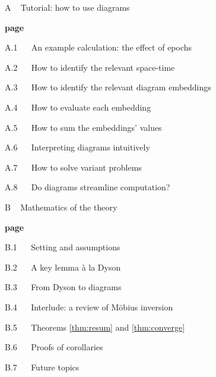 \documentclass[final,12pt]{colt2021} %
\begin{document}
        {\bf
        \par\noindent A ~ Tutorial: how to use diagrams}                        \hfill {\bf page \pageref{appendix:tutorial}}
        \par\indent     A.1 ~~ An example calculation: the effect of epochs     \hfill \pageref{appendix:example}
        \par\indent     A.2 ~~ How to identify the relevant space-time          \hfill \pageref{appendix:draw-spacetime} 
        \par\indent     A.3 ~~ How to identify the relevant diagram embeddings  \hfill \pageref{appendix:draw-embeddings}
        \par\indent     A.4 ~~ How to evaluate each embedding                   \hfill \pageref{appendix:evaluate-embeddings}
        \par\indent     A.5 ~~ How to sum the embeddings' values                \hfill \pageref{appendix:sum-embeddings}
        \par\indent     A.6 ~~ Interpreting diagrams intuitively                \hfill \pageref{appendix:interpret-diagrams}
        \par\indent     A.7 ~~ How to solve variant problems                    \hfill \pageref{appendix:solve-variants}
        \par\indent     A.8 ~~ Do diagrams streamline computation?              \hfill \pageref{appendix:diagrams-streamline}
    
        {\bf
        \par\noindent B ~ Mathematics of the theory}                            \hfill {\bf page \pageref{appendix:math}}
        \par\indent     B.1 ~~ Setting and assumptions                          \hfill \pageref{appendix:assumptions}
        \par\indent     B.2 ~~ A key lemma \`a la Dyson                         \hfill \pageref{appendix:key-lemma}
        \par\indent     B.3 ~~ From Dyson to diagrams                           \hfill \pageref{appendix:toward-diagrams}
        \par\indent     B.4 ~~ Interlude: a review of M\"obius inversion        \hfill \pageref{appendix:mobius}
        \par\indent     B.5 ~~ Theorems \ref{thm:resum} and \ref{thm:converge}  \hfill \pageref{appendix:resum}
        \par\indent     B.6 ~~ Proofs of corollaries                            \hfill \pageref{appendix:corollaries}
        \par\indent     B.7 ~~ Future topics                                    \hfill \pageref{appendix:future}
    
\end{document}
